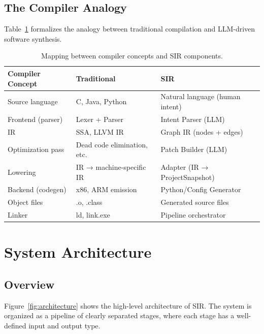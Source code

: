 \documentclass[11pt,a4paper]{article}
\begin{document}
\subsection{The Compiler Analogy}

Table~\ref{tab:analogy} formalizes the analogy between traditional compilation and LLM-driven software synthesis.

\begin{table}[h]
\centering
\caption{Mapping between compiler concepts and SIR components.}
\label{tab:analogy}
\begin{tabular}{@{}lll@{}}
\toprule
\textbf{Compiler Concept} & \textbf{Traditional} & \textbf{SIR} \\
\midrule
Source language & C, Java, Python & Natural language (human intent) \\
Frontend (parser) & Lexer + Parser & Intent Parser (LLM) \\
IR & SSA, LLVM IR & Graph IR (nodes + edges) \\
Optimization pass & Dead code elimination, etc. & Patch Builder (LLM) \\
Lowering & IR → machine-specific IR & Adapter (IR → ProjectSnapshot) \\
Backend (codegen) & x86, ARM emission & Python/Config Generator \\
Object files & .o, .class & Generated source files \\
Linker & ld, link.exe & Pipeline orchestrator \\
\bottomrule
\end{tabular}
\end{table}

\section{System Architecture}

\subsection{Overview}

Figure~\ref{fig:architecture} shows the high-level architecture of SIR. The system is organized as a pipeline of clearly separated stages, where each stage has a well-defined input and output type.
\end{document}
